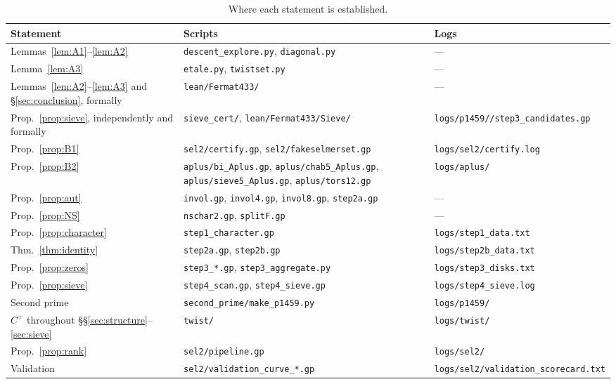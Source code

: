 \documentclass[11pt,reqno]{amsart}
\theoremstyle{plain}
\theoremstyle{definition}
\numberwithin{equation}{section}
\begin{document}
\begin{table}[ht]
\caption{Where each statement is established.}\label{tab:scripts}
\footnotesize
\renewcommand{\arraystretch}{1.15}
\begin{tabular}{@{}>{\raggedright\arraybackslash}p{}
                  >{\raggedright\arraybackslash}p{}
                  >{\raggedright\arraybackslash}p{}@{}}
\toprule
Statement & Scripts & Logs \\
\midrule
Lemmas~\ref{lem:A1}--\ref{lem:A2} &
  \texttt{descent\_explore.py}, \texttt{diagonal.py} & --- \\
Lemma~\ref{lem:A3} &
  \texttt{etale.py}, \texttt{twistset.py} & --- \\
Lemmas~\ref{lem:A2}--\ref{lem:A3} and \S\ref{sec:conclusion}, formally &
  \texttt{lean/Fermat433/} & --- \\
Prop.~\ref{prop:sieve}, independently and formally &
  \texttt{sieve\_cert/}, \texttt{lean/Fermat433/\allowbreak Sieve/} &
  \texttt{logs/p1459/\allowbreak */step3\_\allowbreak candidates.gp} \\
Prop.~\ref{prop:B1} &
  \texttt{sel2/certify.gp}, \texttt{sel2/fakeselmerset.gp} &
  \texttt{logs/sel2/certify.log} \\
Prop.~\ref{prop:B2} &
  \texttt{aplus/bi\_Aplus.gp}, \texttt{aplus/chab5\_Aplus.gp},
  \texttt{aplus/sieve5\_Aplus.gp}, \texttt{aplus/tors12.gp} &
  \texttt{logs/aplus/} \\
Prop.~\ref{prop:aut} &
  \texttt{invol.gp}, \texttt{invol4.gp}, \texttt{invol8.gp}, \texttt{step2a.gp} & --- \\
Prop.~\ref{prop:NS} &
  \texttt{nschar2.gp}, \texttt{splitF.gp} & --- \\
Prop.~\ref{prop:character} &
  \texttt{step1\_character.gp} & \texttt{logs/step1\_data.txt} \\
Thm.~\ref{thm:identity} &
  \texttt{step2a.gp}, \texttt{step2b.gp} & \texttt{logs/step2b\_data.txt} \\
Prop.~\ref{prop:zeros} &
  \texttt{step3\_*.gp}, \texttt{step3\_aggregate.py} &
  \texttt{logs/step3\_disks.txt} \\
Prop.~\ref{prop:sieve} &
  \texttt{step4\_scan.gp}, \texttt{step4\_sieve.gp} &
  \texttt{logs/step4\_sieve.log} \\
Second prime &
  \texttt{second\_prime/make\_p1459.py} & \texttt{logs/p1459/} \\
$C^{+}$ throughout \S\S\ref{sec:structure}--\ref{sec:sieve} &
  \texttt{twist/} & \texttt{logs/twist/} \\
Prop.~\ref{prop:rank} &
  \texttt{sel2/pipeline.gp} & \texttt{logs/sel2/} \\
Validation &
  \texttt{sel2/validation\_\allowbreak curve\_*.gp} &
  \texttt{logs/sel2/\allowbreak validation\_\allowbreak scorecard.txt} \\
\bottomrule
\end{tabular}
\end{table}
\end{document}
